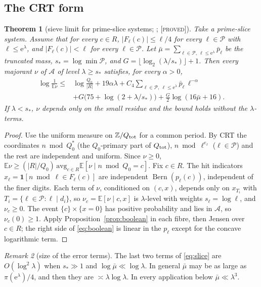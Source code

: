 \documentclass[10pt,reqno]{amsart}
\newtheorem{theorem}{Theorem}[section]
\theoremstyle{definition}
\theoremstyle{remark}
\newtheorem{remark}[theorem]{Remark}
\newcommand{\A}{\mathcal A}
\newcommand{\cP}{\mathcal P}
\newcommand{\E}{\mathbb E}
\newcommand{\Z}{\mathbb Z}
\newcommand{\ind}{\mathbf 1}
\newcommand{\Bern}{\operatorname{Bern}}
\newcommand{\e}{\mathrm e}
\newcommand{\lab}[1]{\textup{[\textsc{#1}]}}
\begin{document}
\subsection{The CRT form}
\begin{theorem}[sieve limit for prime-slice systems; {\cite[Thm~2.5]{ET}}; \lab{proved}]\label{thm:slice}
Take a prime-slice system.  Assume that for every $c\in R$,
$|F_\ell(c)|\leq\ell/4$ for every $\ell\in\cP$ with $\ell\leq\e^\lambda$, and
$|F_\ell(c)|<\ell$ for every $\ell\in\cP$.  Let
$\bar\mu=\sum_{\ell\in\cP,\ \ell\leq\e^\lambda}\bar p_\ell$ be the truncated
mass, $s_*=\log\min\cP$, and $G=\lfloor\log_2(\lambda/s_*)\rfloor+1$.  Then
every majorant $\nu$ of $\A$ of level $\lambda\geq s_*$ satisfies, for every
$\alpha>0$,
\begin{equation}\label{eq:slice}
 \begin{aligned}
 \log\frac1{\E\nu}\leq{}&\log\frac{Q_0}{|R|}+19\alpha\lambda
 +C_4\sum_{\ell\in\cP,\ \ell\leq\e^\lambda}\bar p_\ell\,\ell^{-\alpha}\\
 &+G\bigl(75+\log(2+\lambda/s_*)\bigr)+\frac G2\log(16\bar\mu+16).
 \end{aligned}
\end{equation}
If $\lambda<s_*$, $\nu$ depends only on the small residue and the bound
holds without the $\lambda$-terms.
\end{theorem}
\begin{proof}
Use the uniform measure on $\Z/Q_{\rm tot}$ for a common period.  By CRT
the coordinates $n\bmod Q_0^*$ (the $Q_0$-primary part of $Q_{\rm tot}$),
$n\bmod\ell^{e_\ell}$ ($\ell\in\cP$) and the rest are independent and
uniform.  Since $\nu\geq0$,
$\E\nu\geq(|R|/Q_0)\,\mathrm{avg}_{c\in R}\E[\nu\mid n\bmod Q_0=c]$.  Fix
$c\in R$.  The hit indicators $x_\ell=\ind[n\bmod\ell\in F_\ell(c)]$ are
independent $\Bern(p_\ell(c))$, independent of the finer digits.  Each term
of $\nu$, conditioned on $(c,x)$, depends only on $x_{T_i}$ with
$T_i=\{\ell\in\cP:\ell\mid d_i\}$, so $\nu_c=\E[\nu\mid c,x]$ is
$\lambda$-level with weights $s_\ell=\log\ell$, and $\nu_c\geq0$.  The event
$\{c\}\times\{x=0\}$ has positive probability and lies in $\A$, so
$\nu_c(0)\geq1$.  Apply Proposition~\ref{prop:boolean} in each fibre, then
Jensen over $c\in R$; the right side of \eqref{eq:boolean} is linear in
the $p_\ell$ except for the concave logarithmic term.
\end{proof}

\begin{remark}[size of the error terms]\label{rem:errors}
The last two terms of \eqref{eq:slice} are $O(\log^2\lambda)$ when
$s_*\gg1$ and $\log\bar\mu\ll\log\lambda$.  In general $\bar\mu$ may be as
large as $\pi(\e^\lambda)/4$, and then they are $\asymp\lambda\log\lambda$.
In every application below $\bar\mu\ll\lambda^3$.
\end{remark}
\end{document}

